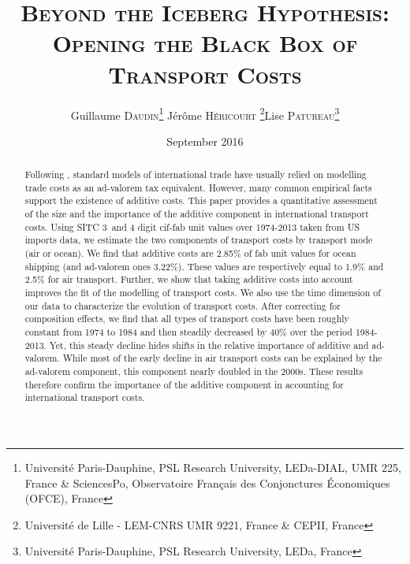 \documentclass[a4paper,11pt]{article}
\begin{document}
\title{\textsc{Beyond the Iceberg Hypothesis: \\Opening the Black Box of Transport Costs}} %
\author{Guillaume \textsc{Daudin}\thanks{%
Universit\'{e} Paris-Dauphine, PSL Research University, LEDa-DIAL, UMR 225, France \&
SciencesPo, Observatoire Français des Conjonctures \'{E}conomiques (OFCE), France}  \qquad J\'{e}r\^{o}me \textsc{H\'{e}ricourt} \thanks{Universit\'{e} de Lille - LEM-CNRS UMR 9221, France \& CEPII, France}\qquad Lise \textsc{Patureau}\thanks{Universit\'{e} Paris-Dauphine, PSL Research University, LEDa, France } }


\date{September 2016}
 \maketitle
\bigskip

\begin{abstract}
Following \cite{samuelson1954}, standard models of international trade have usually relied on modelling trade costs as an ad-valorem tax equivalent. However, many common empirical facts support the existence of additive costs. This paper provides a quantitative assessment of the size and the importance of the additive component in international transport costs.
Using SITC 3 and 4 digit cif-fab unit values over 1974-2013 taken from US imports data, we estimate the two components of transport costs by transport mode (air or ocean).
We find that additive costs are 2.85\% of fab unit values for ocean shipping (and ad-valorem ones 3.22\%). These values are respectively equal to 1.9\% and 2.5\% for air transport. Further, we show that taking additive costs into account improves the fit of the modelling of transport costs.
We also use the time dimension of our data to characterize the evolution of transport costs. After correcting for composition effects, we find that all types of transport costs have been roughly constant from 1974 to 1984 and then steadily decreased by 40\% over the period 1984-2013. Yet, this steady decline hides shifts in the relative importance of additive and ad-valorem. While most of the early decline in air transport costs can be explained by the ad-valorem component, this component nearly doubled in the 2000s. These results therefore confirm the importance of the additive component in accounting for international transport costs.
\end{abstract}
\end{document}
